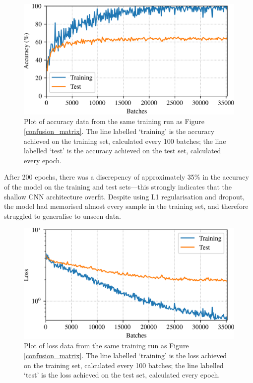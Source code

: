 \documentclass[conference]{IEEEtran}
\begin{document}
\begin{figure}[htbp]
    \centerline{\includegraphics[width=\columnwidth]{accuracy.png}}
    \caption{
        Plot of accuracy data from the same training run as Figure \ref{confusion_matrix}.
        The line labelled `training' is the accuracy achieved on the training set, calculated every 100 batches; the line labelled `test' is the accuracy achieved on the test set, calculated every epoch.}
    \label{accuracy_curves}
\end{figure}

After 200 epochs, there was a discrepency of approximately 35\% in the accuracy of the model on the training and test sets---this strongly indicates that the shallow CNN architecture overfit.
Despite using L1 regularisation and dropout, the model had memorised almost every sample in the training set, and therefore struggled to generalise to unseen data.

\begin{figure}[htbp]
    \centerline{\includegraphics[width=\columnwidth]{loss.png}}
    \caption{
        Plot of loss data from the same training run as Figure \ref{confusion_matrix}.
        The line labelled `training' is the loss achieved on the training set, calculated every 100 batches; the line labelled `test' is the loss achieved on the test set, calculated every epoch.
    }
    \label{loss_curves}
\end{figure}
\end{document}
